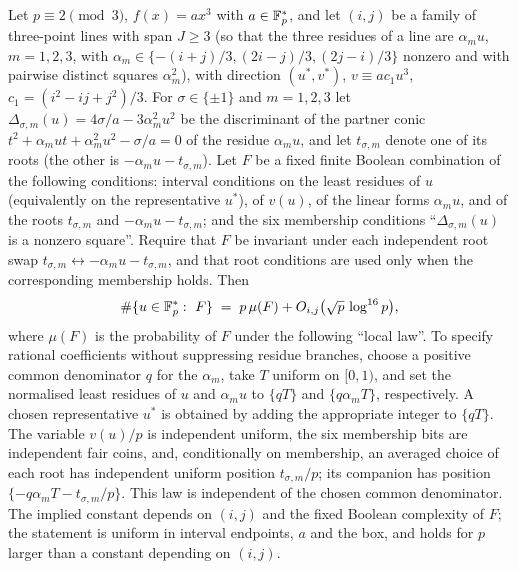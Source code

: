 
\begin{lemma}\label{lem:fe}
Let $p\equiv2\pmod3$, $f(x)=ax^3$ with $a\in\mathbb{F}_p^*$, and let $(i,j)$ be a family of three-point lines with span $J\ge3$ (so that the three residues of a
line are $\alpha_mu$, $m=1,2,3$, with $\alpha_m\in\{-(i+j)/3,(2i-j)/3,(2j-i)/3\}$ nonzero and with pairwise distinct squares $\alpha_m^2$), with direction
$(u^*,v^*)$, $v\equiv ac_1u^3$, $c_1=(i^2-ij+j^2)/3$.  For $\sigma\in\{\pm1\}$ and $m=1,2,3$ let $\Delta_{\sigma,m}(u)=4\sigma/a-3\alpha_m^2u^2$ be the
discriminant of the partner conic $t^2+\alpha_mut+\alpha_m^2u^2-\sigma/a=0$ of the residue $\alpha_mu$, and let $t_{\sigma,m}$ denote one of its roots
(the other is $-\alpha_mu-t_{\sigma,m}$).  Let $F$ be a fixed finite Boolean combination of the following conditions: interval conditions on the least
residues of $u$ (equivalently on the representative $u^*$), of $v(u)$, of the linear forms $\alpha_mu$, and of the roots $t_{\sigma,m}$ and
$-\alpha_mu-t_{\sigma,m}$; and the six membership conditions ``$\Delta_{\sigma,m}(u)$ is a nonzero square''.  Require that $F$ be invariant under each independent root swap $t_{\sigma,m}\leftrightarrow-\alpha_mu-t_{\sigma,m}$, and that root conditions are used only when the corresponding membership holds.  Then
\[
 \#\{u\in\Fp^*:\ F\}\;=\;p\,\mu(F)+O_{i,j}\bigl(\sqrt p\,\log^{16}p\bigr),
\]
where $\mu(F)$ is the probability of $F$ under the following ``local law''.  To specify rational coefficients without suppressing residue branches,
choose a positive common denominator $q$ for the $\alpha_m$, take $T$ uniform on $[0,1)$, and set the normalised least residues of $u$ and $\alpha_mu$
to $\{qT\}$ and $\{q\alpha_mT\}$, respectively.  A chosen representative $u^*$ is obtained by adding the appropriate integer to $\{qT\}$.
The variable $v(u)/p$ is independent uniform, the six membership bits are independent fair coins, and, conditionally on membership,
an averaged choice of each root has independent uniform position $t_{\sigma,m}/p$; its companion has position $\{-q\alpha_mT-t_{\sigma,m}/p\}$.
This law is independent of the chosen common denominator.  The implied constant depends on $(i,j)$ and the fixed Boolean complexity of $F$;
the statement is uniform in interval endpoints, $a$ and the box, and holds for $p$ larger than a constant depending on $(i,j)$.
\end{lemma}
